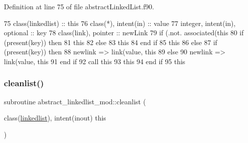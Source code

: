 Definition at line 75 of file abstract\+Linked\+List.\+f90.


\begin{DoxyCode}
75     \textcolor{keywordtype}{class}(linkedlist) :: this
76     \textcolor{keywordtype}{class}(*), \textcolor{keywordtype}{intent(in)} :: value
77     \textcolor{keywordtype}{integer}, \textcolor{keywordtype}{intent(in)}, \textcolor{keywordtype}{optional} :: key
78     \textcolor{keywordtype}{class}(link), \textcolor{keywordtype}{pointer} :: newLink
79     \textcolor{keywordflow}{if} (.not. \textcolor{keyword}{associated}(this%
80         \textcolor{keywordflow}{if} (\textcolor{keyword}{present}(key)) \textcolor{keywordflow}{then}
81             this%
82         \textcolor{keywordflow}{else}
83             this%
84 \textcolor{keywordflow}{        end if}
85         this%
86     \textcolor{keywordflow}{else}
87         \textcolor{keywordflow}{if} (\textcolor{keyword}{present}(key)) \textcolor{keywordflow}{then}
88             newlink => link(\textcolor{keywordtype}{value}, this%
89         \textcolor{keywordflow}{else}
90             newlink => link(\textcolor{keywordtype}{value}, this%
91 \textcolor{keywordflow}{        end if}
92         \textcolor{keyword}{call }this%
93         this%
94 \textcolor{keywordflow}{    end if}
95     this%
\end{DoxyCode}
\mbox{\label{namespaceabstract__linkedlist__mod_a09300e2f8301965a7137cdd60a3b7ac7}} 
\subsubsection{\texorpdfstring{cleanlist()}{cleanlist()}}
{\footnotesize\ttfamily subroutine abstract\+\_\+linkedlist\+\_\+mod\+::cleanlist (\begin{DoxyParamCaption}\item[{class(\mbox{\hyperlink{structabstract__linkedlist__mod_1_1linkedlist}{linkedlist}}), intent(inout)}]{this }\end{DoxyParamCaption})\hspace{0.3cm}{\ttfamily [private]}}



